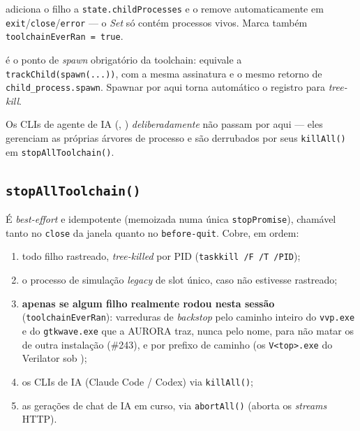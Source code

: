 \begin{description}[leftmargin=*]
  \item[\lstinline|trackChild(child)|] adiciona o filho a
    \lstinline|state.childProcesses| e o remove automaticamente em
    \lstinline|exit|/\lstinline|close|/\lstinline|error| --- o \emph{Set} só
    contém processos vivos. Marca também \lstinline|toolchainEverRan = true|.
  \item[\lstinline|spawnTracked(cmd, args, opts)|] é o ponto de \emph{spawn}
    obrigatório da toolchain: equivale a \lstinline|trackChild(spawn(...))|, com a
    mesma assinatura e o mesmo retorno de \lstinline|child_process.spawn|. Spawnar
    por aqui torna automático o registro para \emph{tree-kill}.
\end{description}

Os CLIs de agente de IA (, )
\emph{deliberadamente} não passam por aqui --- eles gerenciam as próprias árvores
de processo e são derrubados por seus \lstinline|killAll()| em
\lstinline|stopAllToolchain()|.

\subsection{\lstinline|stopAllToolchain()|}

É \emph{best-effort} e idempotente (memoizada numa única \lstinline|stopPromise|),
chamável tanto no \lstinline|close| da janela quanto no \lstinline|before-quit|.
Cobre, em ordem:

\begin{enumerate}[leftmargin=*]
  \item todo filho rastreado, \emph{tree-killed} por PID
    (\lstinline|taskkill /F /T /PID|);
  \item o processo de simulação \emph{legacy} de slot único, caso não estivesse
    rastreado;
  \item \textbf{apenas se algum filho realmente rodou nesta sessão}
    (\lstinline|toolchainEverRan|): varreduras de \emph{backstop} pelo
    caminho inteiro do \lstinline|vvp.exe| e do \lstinline|gtkwave.exe| que a
    AURORA traz, nunca pelo nome, para não matar os de outra instalação
    (\#243), e por prefixo de caminho (os \lstinline|V<top>.exe| do Verilator
    sob );
  \item os CLIs de IA (Claude Code / Codex) via \lstinline|killAll()|;
  \item as gerações de chat de IA em curso, via \lstinline|abortAll()| (aborta os
    \emph{streams} HTTP).
\end{enumerate}

